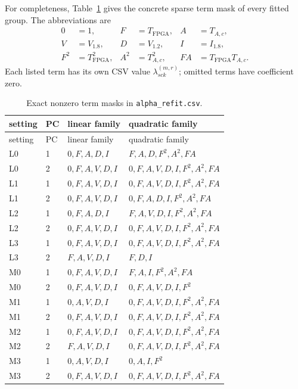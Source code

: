 \documentclass[11pt]{article}
\begin{document}
For completeness, Table~\ref{tab:sparse-masks} gives the concrete sparse
term mask of every fitted group.  The abbreviations are
\begin{equation*}
  \begin{aligned}
    0&=1, & F&=T_{\mathrm{FPGA}}, & A&=T_{A,c}, \\
    V&=V_{1.8}, & D&=V_{1.2}, & I&=I_{1.8}, \\
    F^2&=T_{\mathrm{FPGA}}^2, & A^2&=T_{A,c}^2,
      & FA&=T_{\mathrm{FPGA}}T_{A,c}.
  \end{aligned}
\end{equation*}
Each listed term has its own CSV value
$\lambda^{(m,r)}_{sck}$; omitted terms have coefficient zero.

\begin{longtable}{@{}llp{}p{}@{}}
\caption{Exact nonzero term masks in \texttt{alpha\_refit.csv}.}
\label{tab:sparse-masks}\\
\toprule
setting & PC & linear family & quadratic family \\
\midrule
\endfirsthead
\toprule
setting & PC & linear family & quadratic family \\
\midrule
\endhead
L0 & 1 & $0,F,A,D,I$ & $F,A,D,F^2,A^2,FA$ \\
L0 & 2 & $0,F,A,V,D,I$ & $0,F,A,V,D,I,F^2,A^2,FA$ \\
L1 & 1 & $0,F,A,V,D,I$ & $0,F,A,V,D,I,F^2,A^2,FA$ \\
L1 & 2 & $0,F,A,V,D,I$ & $0,F,A,D,I,F^2,A^2,FA$ \\
L2 & 1 & $0,F,A,D,I$ & $F,A,V,D,I,F^2,A^2,FA$ \\
L2 & 2 & $0,F,A,V,D,I$ & $0,F,A,V,D,I,F^2,A^2,FA$ \\
L3 & 1 & $0,F,A,V,D,I$ & $0,F,A,V,D,I,F^2,A^2,FA$ \\
L3 & 2 & $F,A,V,D,I$ & $F,D,I$ \\
M0 & 1 & $0,F,A,V,D,I$ & $F,A,I,F^2,A^2,FA$ \\
M0 & 2 & $0,F,A,V,D,I$ & $0,F,A,V,D,I,F^2$ \\
M1 & 1 & $0,A,V,D,I$ & $0,F,A,V,D,I,F^2,A^2,FA$ \\
M1 & 2 & $0,F,A,V,D,I$ & $0,F,A,V,D,I,F^2,A^2,FA$ \\
M2 & 1 & $0,F,A,V,D,I$ & $0,F,A,V,D,I,F^2,A^2,FA$ \\
M2 & 2 & $F,A,V,D,I$ & $0,F,A,V,D,I,F^2,A^2,FA$ \\
M3 & 1 & $0,A,V,D,I$ & $0,A,I,F^2$ \\
M3 & 2 & $0,F,A,V,D,I$ & $0,F,A,V,D,I,F^2,A^2,FA$ \\

\end{longtable}
\end{document}
